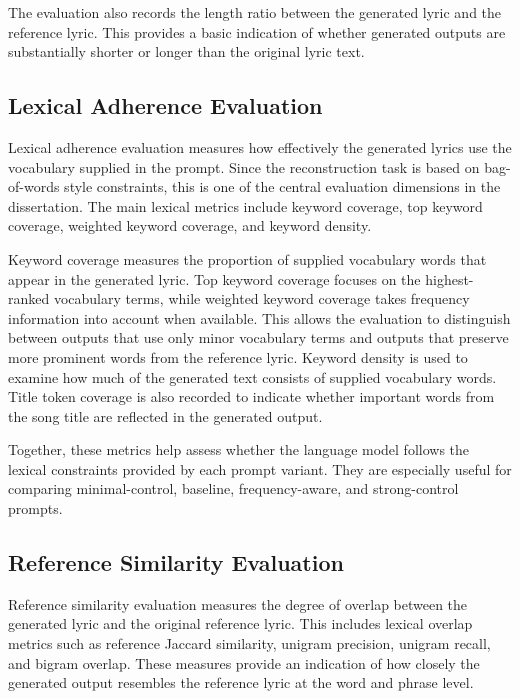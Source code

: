 The evaluation also records the length ratio between the generated lyric and the reference lyric. This provides a basic indication of whether generated outputs are substantially shorter or longer than the original lyric text.

\subsection{Lexical Adherence Evaluation}

Lexical adherence evaluation measures how effectively the generated lyrics use the vocabulary supplied in the prompt. Since the reconstruction task is based on bag-of-words style constraints, this is one of the central evaluation dimensions in the dissertation. The main lexical metrics include keyword coverage, top keyword coverage, weighted keyword coverage, and keyword density.

Keyword coverage measures the proportion of supplied vocabulary words that appear in the generated lyric. Top keyword coverage focuses on the highest-ranked vocabulary terms, while weighted keyword coverage takes frequency information into account when available. This allows the evaluation to distinguish between outputs that use only minor vocabulary terms and outputs that preserve more prominent words from the reference lyric. Keyword density is used to examine how much of the generated text consists of supplied vocabulary words. Title token coverage is also recorded to indicate whether important words from the song title are reflected in the generated output.

Together, these metrics help assess whether the language model follows the lexical constraints provided by each prompt variant. They are especially useful for comparing minimal-control, baseline, frequency-aware, and strong-control prompts.

\subsection{Reference Similarity Evaluation}

Reference similarity evaluation measures the degree of overlap between the generated lyric and the original reference lyric. This includes lexical overlap metrics such as reference Jaccard similarity, unigram precision, unigram recall, and bigram overlap. These measures provide an indication of how closely the generated output resembles the reference lyric at the word and phrase level.

